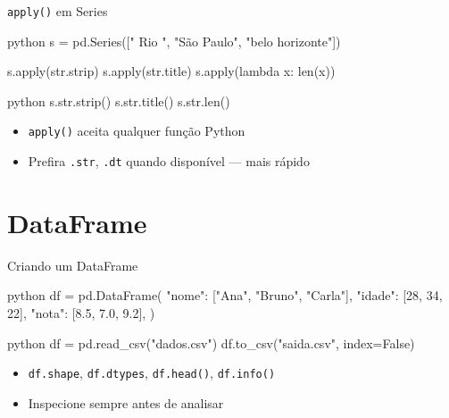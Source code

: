 \documentclass[xcolor=dvipsnames,t,aspectratio=169]{beamer}
\newcommand{\highlight}[1]{{\color{nes_dark_orange} #1}}
\begin{document}
\begin{frame}[c, fragile]{\texttt{apply()} em Series}

\begin{code}{python}
s = pd.Series(["  Rio  ", "São Paulo", "belo horizonte"])

s.apply(str.strip)
s.apply(str.title)
s.apply(lambda x: len(x))
\end{code}

\begin{code}{python}
s.str.strip()
s.str.title()
s.str.len()
\end{code}

\begin{itemize}
    \item \texttt{apply()} aceita qualquer função Python
    \item \highlight{Prefira} \texttt{.str}, \texttt{.dt} quando disponível — mais rápido
\end{itemize}

\end{frame}


\section{DataFrame}

\begin{frame}[c, fragile]{Criando um DataFrame}

\begin{code}{python}
df = pd.DataFrame({
    "nome":  ["Ana", "Bruno", "Carla"],
    "idade": [28, 34, 22],
    "nota":  [8.5, 7.0, 9.2],
})
\end{code}

\begin{code}{python}
df = pd.read_csv("dados.csv")
df.to_csv("saida.csv", index=False)
\end{code}

\begin{itemize}
    \item \texttt{df.shape}, \texttt{df.dtypes}, \texttt{df.head()}, \texttt{df.info()}
    \item Inspecione \highlight{sempre} antes de analisar
\end{itemize}

\end{frame}
\end{document}
